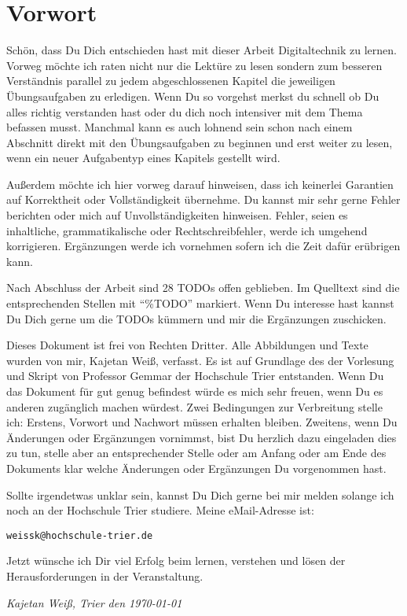 \chapter*{Vorwort}
Schön, dass Du Dich entschieden hast mit dieser Arbeit Digitaltechnik zu lernen. Vorweg möchte ich raten nicht nur die Lektüre zu lesen sondern zum besseren Verständnis parallel zu jedem abgeschlossenen Kapitel die jeweiligen Übungsaufgaben zu erledigen. Wenn Du so vorgehst merkst du schnell ob Du alles richtig verstanden hast oder du dich noch intensiver mit dem Thema befassen musst. Manchmal kann es auch lohnend sein schon nach einem Abschnitt direkt mit den Übungsaufgaben zu beginnen und erst weiter zu lesen, wenn ein neuer Aufgabentyp eines Kapitels gestellt wird.

Außerdem möchte ich hier vorweg darauf hinweisen, dass ich keinerlei Garantien auf Korrektheit oder Vollständigkeit übernehme. Du kannst mir sehr gerne Fehler berichten oder mich auf Unvollständigkeiten hinweisen. Fehler, seien es inhaltliche, grammatikalische oder Rechtschreibfehler, werde ich umgehend korrigieren. Ergänzungen werde ich vornehmen sofern ich die Zeit dafür erübrigen kann.

Nach Abschluss der Arbeit sind 28 TODOs offen geblieben. Im Quelltext sind die entsprechenden Stellen mit "`\%TODO"' markiert. Wenn Du interesse hast kannst Du Dich gerne um die TODOs kümmern und mir die Ergänzungen zuschicken.

Dieses Dokument ist frei von Rechten Dritter. Alle Abbildungen und Texte wurden von mir, Kajetan Weiß, verfasst. Es ist auf Grundlage des der Vorlesung und Skript von Professor Gemmar der Hochschule Trier entstanden. Wenn Du das Dokument für gut genug befindest würde es mich sehr freuen, wenn Du es anderen zugänglich machen würdest. Zwei Bedingungen zur Verbreitung stelle ich: Erstens, Vorwort und Nachwort müssen erhalten bleiben. Zweitens, wenn Du Änderungen oder Ergänzungen vornimmst, bist Du herzlich dazu eingeladen dies zu tun, stelle aber an entsprechender Stelle oder am Anfang oder am Ende des Dokuments klar welche Änderungen oder Ergänzungen Du vorgenommen hast.

Sollte irgendetwas unklar sein, kannst Du Dich gerne bei mir melden solange ich noch an der Hochschule Trier studiere. Meine eMail-Adresse ist:
\begin{center}
	\texttt{weissk@hochschule-trier.de}
\end{center}

Jetzt wünsche ich Dir viel Erfolg beim lernen, verstehen und lösen der Herausforderungen in der Veranstaltung.

\vspace{2cm}

\textsl{Kajetan Weiß, Trier den \today}